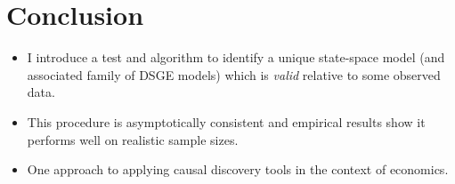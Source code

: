 \documentclass{article}
\begin{document}
\section*{Conclusion}
\begin{itemize}
    \item I introduce a test and algorithm to identify a unique state-space model (and associated family of DSGE models) which is \textit{valid} relative to some observed data.
    \item This procedure is asymptotically consistent and empirical results show it performs well on realistic sample sizes.
    \item One approach to applying causal discovery tools in the context of economics.
\end{itemize}
\end{document}
